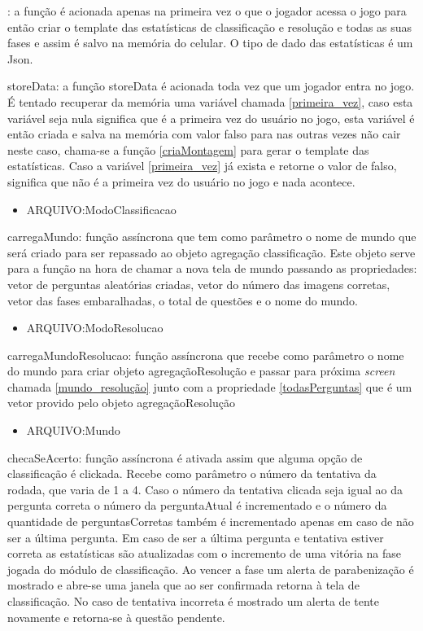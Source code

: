 \label{criaMontagem}: a função é acionada apenas na primeira vez o que o jogador acessa o jogo para então criar o template das estatísticas de classificação e resolução e todas as suas fases e assim é salvo na memória do celular. O tipo de dado das estatísticas é um Json.

storeData: a função storeData é acionada toda vez que um jogador entra no jogo. É tentado recuperar da memória uma variável chamada \ref{primeira_vez}, caso esta variável seja nula significa que é a primeira vez do usuário no jogo, esta variável é então criada e salva na memória com valor falso para nas outras vezes não cair neste caso, chama-se a função \ref{criaMontagem} para gerar o template das estatísticas. Caso a variável \ref{primeira_vez} já exista e retorne o valor de falso, significa que não é a primeira vez do usuário no jogo e nada acontece.

\begin{itemize}
\item ARQUIVO:ModoClassificacao
\end{itemize}
carregaMundo: função assíncrona que tem como parâmetro o nome de mundo que será criado para ser repassado ao objeto agregação classificação. Este objeto serve para a função na hora de chamar a nova tela de mundo passando as propriedades: vetor de perguntas aleatórias criadas, vetor do número das imagens corretas, vetor das fases embaralhadas, o total de questões e o nome do mundo.

\begin{itemize}
\item ARQUIVO:ModoResolucao
\end{itemize}	
carregaMundoResolucao: função assíncrona que recebe como parâmetro o nome do mundo para criar objeto agregaçãoResolução e passar para próxima \textit{screen} chamada \ref{mundo_resolução} junto com a propriedade \ref{todasPerguntas} que é um vetor provido pelo objeto agregaçãoResolução

\begin{itemize}
\item ARQUIVO:Mundo
\end{itemize}	
checaSeAcerto: função assíncrona é ativada assim que alguma opção de classificação é clickada. Recebe como parâmetro o número da tentativa da rodada, que varia de 1 a 4. Caso o número da tentativa clicada seja igual ao da pergunta correta o número da perguntaAtual é incrementado e o número da quantidade de perguntasCorretas também é incrementado apenas em caso de não ser a última pergunta. Em caso de ser a última pergunta e tentativa estiver correta as estatísticas são atualizadas com o incremento de uma vitória na fase jogada do módulo de classificação. Ao vencer a fase um alerta de parabenização é mostrado e abre-se uma janela que ao ser confirmada retorna à tela de classificação. No caso de tentativa incorreta é mostrado um alerta de tente novamente e retorna-se à questão pendente. 


